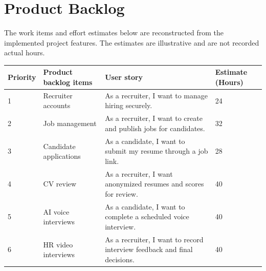 \section{Product Backlog}
%
The work items and effort estimates below are reconstructed from the implemented project features. The estimates are illustrative and are not recorded actual hours.
%
\renewcommand{\arraystretch}{1.25}
\begin{center}
\begin{tabular}{|m{}|m{}|m{}|m{}|}
\hline
{\bf Priority} & {\bf Product backlog items} & {\bf User story} & {\bf Estimate (Hours)}\\
\hline
1 & Recruiter accounts & As a recruiter, I want to manage hiring securely. & 24 \\
\hline
2 & Job management & As a recruiter, I want to create and publish jobs for candidates. & 32 \\
\hline
3 & Candidate applications & As a candidate, I want to submit my resume through a job link. & 28\\
\hline
4 & CV review & As a recruiter, I want anonymized resumes and scores for review. & 40\\
\hline
5 & AI voice interviews & As a candidate, I want to complete a scheduled voice interview. & 40 \\
\hline
6 & HR video interviews & As a recruiter, I want to record interview feedback and final decisions. & 40\\
\hline
\end{tabular}
\end{center}
%
